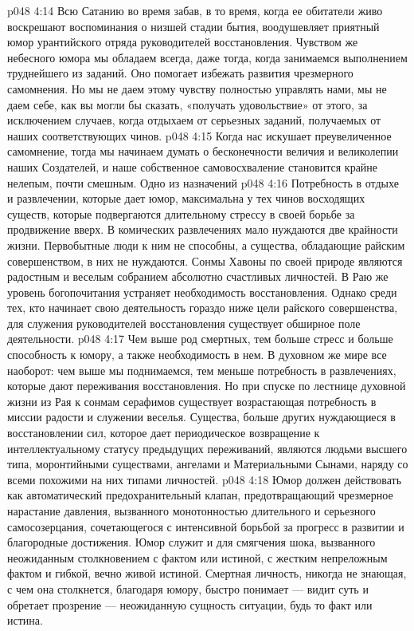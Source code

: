 \vs p048 4:14 \pc Всю Сатанию во время забав, в то время, когда ее обитатели живо воскрешают воспоминания о низшей стадии бытия, воодушевляет приятный юмор урантийского отряда руководителей восстановления. Чувством же небесного юмора мы обладаем всегда, даже тогда, когда занимаемся выполнением труднейшего из заданий. Оно помогает избежать развития чрезмерного самомнения. Но мы не даем этому чувству полностью управлять нами, мы не даем себе, как вы могли бы сказать, «получать удовольствие» от этого, за исключением случаев, когда отдыхаем от серьезных заданий, получаемых от наших соответствующих чинов.
\vs p048 4:15 Когда нас искушает преувеличенное самомнение, тогда мы начинаем думать о бесконечности величия и великолепии наших Создателей, и наше собственное самовосхваление становится крайне нелепым, почти смешным. Одно из назначений 
\vs p048 4:16 \pc Потребность в отдыхе и развлечении, которые дает юмор, максимальна у тех чинов восходящих существ, которые подвергаются длительному стрессу в своей борьбе за продвижение вверх. В комических развлечениях мало нуждаются две крайности жизни. Первобытные люди к ним не способны, а существа, обладающие райским совершенством, в них не нуждаются. Сонмы Хавоны по своей природе являются радостным и веселым собранием абсолютно счастливых личностей. В Раю же уровень богопочитания устраняет необходимость восстановления. Однако среди тех, кто начинает свою деятельность гораздо ниже цели райского совершенства, для служения руководителей восстановления существует обширное поле деятельности.
\vs p048 4:17 Чем выше род смертных, тем больше стресс и больше способность к юмору, а также необходимость в нем. В духовном же мире все наоборот: чем выше мы поднимаемся, тем меньше потребность в развлечениях, которые дают переживания восстановления. Но при спуске по лестнице духовной жизни из Рая к сонмам серафимов существует возрастающая потребность в миссии радости и служении веселья. Существа, больше других нуждающиеся в восстановлении сил, которое дает периодическое возвращение к интеллектуальному статусу предыдущих переживаний, являются людьми высшего типа, моронтийными существами, ангелами и Материальными Сынами, наряду со всеми похожими на них типами личностей.
\vs p048 4:18 Юмор должен действовать как автоматический предохранительный клапан, предотвращающий чрезмерное нарастание давления, вызванного монотонностью длительного и серьезного самосозерцания, сочетающегося с интенсивной борьбой за прогресс в развитии и благородные достижения. Юмор служит и для смягчения шока, вызванного неожиданным столкновением с фактом или истиной, с жестким непреложным фактом и гибкой, вечно живой истиной. Смертная личность, никогда не знающая, с чем она столкнется, благодаря юмору, быстро понимает --- видит суть и обретает прозрение --- неожиданную сущность ситуации, будь то факт или истина.
